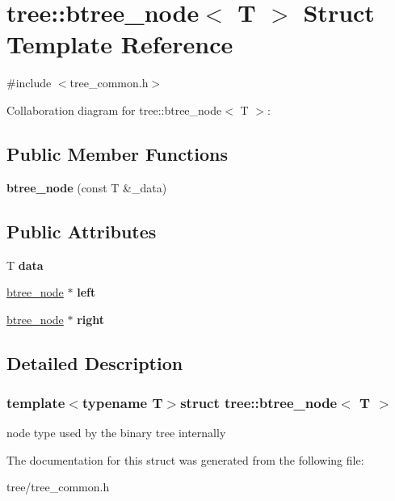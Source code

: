 \hypertarget{structtree_1_1btree__node}{\section{tree\-:\-:btree\-\_\-node$<$ T $>$ Struct Template Reference}
\label{structtree_1_1btree__node}
}


{\ttfamily \#include $<$tree\-\_\-common.\-h$>$}



Collaboration diagram for tree\-:\-:btree\-\_\-node$<$ T $>$\-:
\subsection*{Public Member Functions}
\begin{DoxyCompactItemize}
\item 
\hypertarget{structtree_1_1btree__node_a6f97b71a8cb5cf273cf3a1635a1b8551}{{\bfseries btree\-\_\-node} (const T \&\-\_\-data)}\label{structtree_1_1btree__node_a6f97b71a8cb5cf273cf3a1635a1b8551}

\end{DoxyCompactItemize}
\subsection*{Public Attributes}
\begin{DoxyCompactItemize}
\item 
\hypertarget{structtree_1_1btree__node_a1f44c7c53c16a4f8827b0f4b468d4531}{T {\bfseries data}}\label{structtree_1_1btree__node_a1f44c7c53c16a4f8827b0f4b468d4531}

\item 
\hypertarget{structtree_1_1btree__node_aed5a80dfa830209910c13f7a55b91b83}{\hyperlink{structtree_1_1btree__node}{btree\-\_\-node} $\ast$ {\bfseries left}}\label{structtree_1_1btree__node_aed5a80dfa830209910c13f7a55b91b83}

\item 
\hypertarget{structtree_1_1btree__node_a82e9a7410832850bc4c05a5eb63fab21}{\hyperlink{structtree_1_1btree__node}{btree\-\_\-node} $\ast$ {\bfseries right}}\label{structtree_1_1btree__node_a82e9a7410832850bc4c05a5eb63fab21}

\end{DoxyCompactItemize}


\subsection{Detailed Description}
\subsubsection*{template$<$typename T$>$struct tree\-::btree\-\_\-node$<$ T $>$}

node type used by the binary tree internally 

The documentation for this struct was generated from the following file\-:\begin{DoxyCompactItemize}
\item 
tree/tree\-\_\-common.\-h\end{DoxyCompactItemize}
